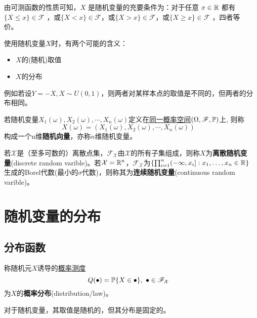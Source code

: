 由可测函数的性质可知，$X$ 是随机变量的充要条件为：对于任意 $x \in \R$ 都有 $\{ X \le x \} \in \mathcal{F}$ ，或$\{ X < x \} \in \mathcal{F}$，或$\{ X > x \} \in \mathcal{F}$，或$\{ X \ge x \} \in \mathcal{F}$ ，四者等价。

\begin{remark}
    使用随机变量$X$时，有两个可能的含义：
    \begin{itemize}
        \item$X$的(随机)取值
        \item$X$的分布
    \end{itemize}
    例如若设$Y=-X, X \sim U(0,1)$，则两者对某样本点的取值是不同的，但两者的分布相同。
\end{remark}

\begin{definition}[随机向量]
    若随机变量$X_1(\omega), X_2(\omega),\cdots , X_n(\omega)$定义在\underline{同一概率空间}$(\Omega,\mathscr{F},\P)$上, 则称
    \[ X(\omega) = (X_1(\omega), X_2(\omega),\cdots , X_n(\omega)) \]
    构成一个n维\textbf{随机向量}，亦称$n$维随机变量。
\end{definition}

\begin{definition}[离散与连续随机变量]
    若$\mathcal{X}$是（至多可数的）离散点集，$\mathscr{F}_{\mathcal{X}}$由$\mathcal{X}$的所有子集组成，则称$X$为\textbf{离散随机变量}(discrete random varible)。若$\mathcal{X} = \R^{n}$，$\mathscr{F}_{\mathcal{X}}$为$\{\prod_{i=1}^{n}(-\infty,x_{i}] : x_{1},\dots,x_{n}\in\R\}$生成的Borel代数(最小的$\sigma$代数)，则称其为\textbf{连续随机变量}(continuous random varible)。
\end{definition}

\section{随机变量的分布}

\subsection{分布函数}

\begin{definition}[概率分布]
    称随机元$X$诱导的\underline{概率测度}
    \[ Q(\bullet)=\P\{X\in\bullet\},\ \bullet\in\mathscr{F}_{\mathcal{X}} \]
    为$X$的\textbf{概率分布}(distribution/law)。
\end{definition}
\begin{remark}
    对于随机变量，其取值是随机的，但其分布是固定的。
\end{remark}

